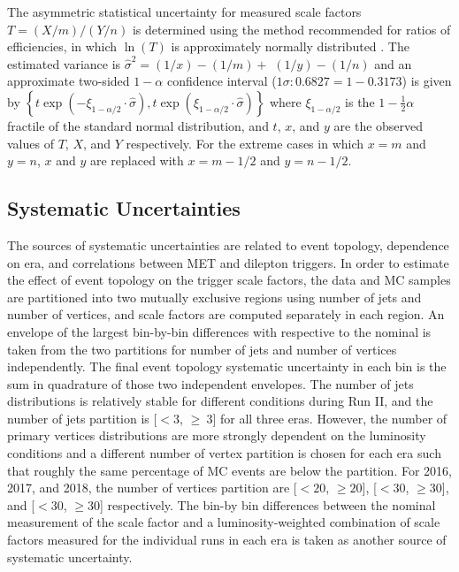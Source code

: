The asymmetric statistical uncertainty for measured scale factors $T=(X / m) /(Y / n)$ is determined using the method recommended for ratios of efficiencies, in which $\ln (T)$ is approximately normally distributed \cite{bib:10.2307/2531405}. 
The estimated variance is  $\hat{\sigma}^{2}=(1 / x)-(1 / m)+$ $(1 / y)-(1 / n)$ and an approximate two-sided $1 - \alpha$ confidence interval ($1 \sigma: 0.6827 = 1 - 0.3173$) is given by $\left\{t \exp \left(-\xi_{1-\alpha / 2} \cdot \hat{\sigma}\right), t \exp \left(\xi_{1-\alpha / 2} \cdot \hat{\sigma}\right)\right\}$ where $\xi_{1-\alpha / 2}$ is the $1-\frac{1}{2} \alpha$ fractile of the standard normal distribution, and $t$, $x$, and $y$ are the observed values of $T$, $X$, and $Y$ respectively.  
For the extreme cases in which $x = m$ and $y = n$, $x$ and $y$ are replaced with $x = m - 1/2$ and $y = n - 1/2$.

\subsection{Systematic Uncertainties}
The sources of systematic uncertainties are related to event topology, dependence on era, and correlations between MET and dilepton triggers.
In order to estimate the effect of event topology on the trigger scale factors, the data and MC samples are partitioned into two mutually exclusive regions using number of jets and number of vertices, and scale factors are computed separately in each region. 
An envelope of the largest bin-by-bin differences with respective to the nominal is taken from the two partitions for number of jets and number of vertices independently.
The final event topology systematic uncertainty in each bin is the sum in quadrature of those two independent envelopes.
The number of jets distributions is relatively stable for different conditions during Run II, and the number of jets partition is [$< 3$, $\geq\ 3$] for all three eras.
However, the number of primary vertices distributions are more strongly dependent on the luminosity conditions and a different number of vertex partition is chosen for each era such that roughly the same percentage of MC events are below the partition.
For 2016, 2017, and 2018, the number of vertices partition are [$< 20$, $\geq 20$], [$< 30$, $\geq 30$], and [$< 30$, $\geq 30$] respectively.
The bin-by bin differences between the nominal measurement of the scale factor and a luminosity-weighted combination of scale factors measured for the individual runs in each era is taken as another source of systematic uncertainty.

